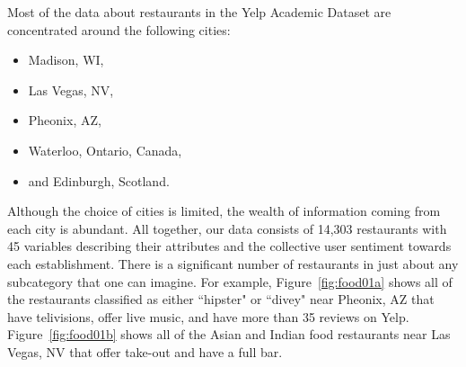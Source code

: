 \documentclass[11pt]{article}
\begin{document}
Most of the data about restaurants in the Yelp Academic Dataset are concentrated around the following cities:
\begin{itemize}
	\item Madison, WI, 
	\item Las Vegas, NV,
	\item Pheonix, AZ,
	\item Waterloo, Ontario, Canada,
	\item and Edinburgh, Scotland.
\end{itemize}
Although the choice of cities is limited, the wealth of information coming from each city is abundant. All together, our data consists of 14,303 restaurants with 45 variables describing their attributes and the collective user sentiment towards each establishment. There is a significant number of restaurants in just about any subcategory that one can imagine. For example, Figure~\ref{fig:food01a} shows all of the restaurants classified as either ``hipster" or ``divey" near Pheonix, AZ that have telivisions, offer live music, and have more than 35 reviews on Yelp. Figure~\ref{fig:food01b} shows all of the Asian and Indian food restaurants near Las Vegas, NV that offer take-out and have a full bar.
\end{document}
